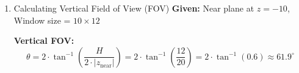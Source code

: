 \documentclass{article}
\begin{document}
\begin{enumerate}
    \item Calculating Vertical Field of View (FOV)
        \medbreak
        \textbf{Given:} Near plane at $z = -10$, Window size = $10 \times 12$
       
        \textbf{Vertical FOV:}
        \[
        \theta = 2 \cdot \tan^{-1}\left(\frac{H}{2 \cdot |z_{\text{near}}|}\right)
        = 2 \cdot \tan^{-1}\left(\frac{12}{20}\right)
        = 2 \cdot \tan^{-1}(0.6)
        \approx 61.9^\circ
        \]

\end{enumerate}
\end{document}
